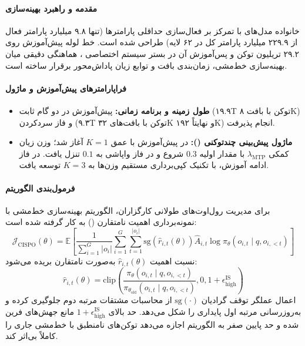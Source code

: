 \item {}

\paragraph*{مقدمه و راهبرد بهینه‌سازی}
خانواده مدل‌های  \cite{minimax2026m2} با تمرکز بر فعال‌سازی حداقلی پارامترها (تنها ۹.۸ میلیارد پارامتر فعال از ۲۲۹.۹ میلیارد پارامتر کل در ۶۲ لایه) طراحی شده است. خط لوله پیش‌آموزش روی ۲۹.۲ تریلیون توکن و پس‌آموزش آن در بستر سیستم اختصاصی ، هماهنگی دقیقی میان بهینه‌سازی خط‌مشی، زمان‌بندی بافت و توابع زیان پاداش‌محور برقرار ساخته است.

\paragraph*{فراپارامترهای پیش‌آموزش و ماژول }
\begin{itemize}
    \item \textbf{طول زمینه و برنامه زمانی:} پیش‌آموزش در دو گام ثابت (۱۹.۹T توکن با بافت ۸K) و فاز سردکردن (۹.۳T توکن با بافت‌های ۳۲K و نهایتاً ۱۹۲K) انجام پذیرفت.
    \item \textbf{ماژول پیش‌بینی چندتوکنی ():} در پیش‌آموزش با عمق $K=1$ آغاز شد؛ وزن زیان کمکی $\lambda_{\text{MTP}}$ با مقدار اولیه $0.3$ شروع و در فاز واپاشی به $0.1$ تنزل یافت. در فاز ادامه آموزش، با تکنیک کپی‌برداری مستقیم وزن‌ها به $K=3$ توسعه یافت.
\end{itemize}

\paragraph*{فرمول‌بندی الگوریتم }
برای مدیریت رول‌اوت‌های طولانی کارگزاران، الگوریتم بهینه‌سازی خط‌مشی با نمونه‌برداری اهمیت نامتقارن () به کار گرفته شده است:
\begin{equation}
    \mathcal{J}_{\text{CISPO}}(\theta) = \mathbb{E} \left[ \frac{1}{\sum_{i=1}^G |o_i|} \sum_{i=1}^G \sum_{t=1}^{|o_i|} \text{sg}\left(\hat{r}_{i,t}(\theta)\right) \hat{A}_{i,t} \log \pi_\theta(o_{i,t} \mid q, o_{i,<t}) \right]
\end{equation}
نسبت اهمیت $\hat{r}_{i,t}(\theta)$ به‌صورت نامتقارن بریده می‌شود:
\begin{equation}
    \hat{r}_{i,t}(\theta) = \text{clip}\left( \frac{\pi_\theta(o_{i,t} \mid q, o_{i,<t})}{\pi_{\theta_{\text{old}}}(o_{i,t} \mid q, o_{i,<t})}, 0, 1 + \epsilon_{\text{high}}^{\text{IS}} \right)
\end{equation}
اعمال عملگر توقف گرادیان $\text{sg}(\cdot)$ از محاسبات مشتقات مرتبه دوم جلوگیری کرده و به‌روزرسانی مرتبه اول پایداری را شکل می‌دهد. حد بالای $1 + \epsilon_{\text{high}}^{\text{IS}}$ مانع جهش‌های فرین شده و حد پایین صفر به الگوریتم اجازه می‌دهد توکن‌های نامنطبق با خط‌مشی جاری را کاملاً بی‌اثر کند.

